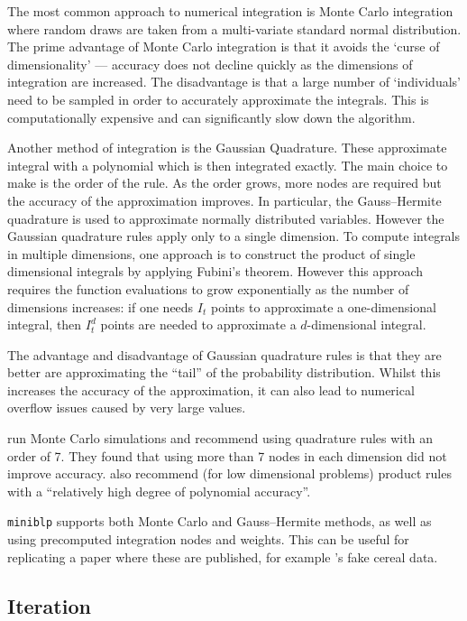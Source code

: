 \documentclass[parskip=half]{scrartcl}
\newcommand{\code}[1]{\texttt{#1}}
\begin{document}
The most common approach to numerical integration is Monte Carlo integration where random draws are taken from a multi-variate standard normal distribution. The prime advantage of Monte Carlo integration is that it avoids the `curse of dimensionality' --- accuracy does not decline quickly as the dimensions of integration are increased. The disadvantage is that a large number of `individuals' need to be sampled in order to accurately approximate the integrals. This is computationally expensive and can significantly slow down the algorithm.

Another method of integration is the Gaussian Quadrature. These approximate integral with a polynomial which is then integrated exactly. The main choice to make is the order of the rule. As the order grows, more nodes are required but the accuracy of the approximation improves. In particular, the Gauss–Hermite quadrature is used to approximate normally distributed variables.
However the Gaussian quadrature rules apply only to a single dimension. To compute integrals in multiple dimensions, one approach is to construct the product of single dimensional integrals by applying Fubini's theorem. However this approach requires the function evaluations to grow exponentially as the number of dimensions increases: if one needs \(I_t\) points to approximate a one-dimensional integral, then \(I_t^d\) points are needed to approximate a \(d\)-dimensional integral.

The advantage and disadvantage of Gaussian quadrature rules is that they are better are approximating the ``tail'' of the probability distribution. Whilst this increases the accuracy of the approximation, it can also lead to numerical overflow issues caused by very large values.

\cite{skrainka2011high} run Monte Carlo simulations and recommend using quadrature rules with an order of 7. They found that using more than 7 nodes in each dimension did not improve accuracy. \cite{conlon2019best} also recommend (for low dimensional problems) product rules with a ``relatively high degree of polynomial accuracy''.

\code{miniblp} supports both Monte Carlo and Gauss–Hermite methods, as well as using precomputed integration nodes and weights. This can be useful for replicating a paper where these are published, for example \cite{nevo2000practitioner}'s fake cereal data.

\subsection{Iteration}
\end{document}
